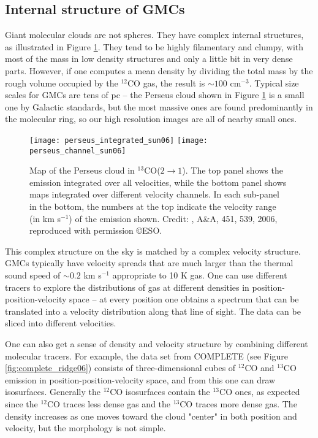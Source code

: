\subsection{Internal structure of GMCs}

Giant molecular clouds are not spheres. They have complex internal structures, as illustrated in Figure \ref{fig:perseus_sun06}. They tend to be highly filamentary and clumpy, with most of the mass in low density structures and only a little bit in very dense parts. However, if one computes a mean density by dividing the total mass by the rough volume occupied by the $^{12}$CO gas, the result is $\sim 100$ cm$^{-3}$. Typical size scales for GMCs are tens of pc -- the Perseus cloud shown in Figure \ref{fig:perseus_sun06} is a small one by Galactic standards, but the most massive ones are found predominantly in the molecular ring, so our high resolution images are all of nearby small ones.

\begin{figure}
\texttt{[image: perseus\_integrated\_sun06]}
\texttt{[image: perseus\_channel\_sun06]}
\caption[$^{13}$CO($2\rightarrow 1$) maps of Perseus]{
\label{fig:perseus_sun06}
Map of the Perseus cloud in $^{13}$CO($2\rightarrow 1$). The top panel shows the emission integrated over all velocities, while the bottom panel shows maps integrated over different velocity channels. In each sub-panel in the bottom, the numbers at the top indicate the velocity range (in km s$^{-1}$) of the emission shown. Credit: \citeauthor{sun06a}, A\&A, 451, 539, 2006, reproduced with
permission \copyright ESO.
}
\end{figure}

This complex structure on the sky is matched by a complex velocity structure. GMCs typically have velocity spreads that are much larger than the thermal sound speed of $\sim 0.2$ km s$^{-1}$ appropriate to 10 K gas. One can use different tracers to explore the distributions of gas at different densities in position-position-velocity space -- at every position one obtains a spectrum that can be translated into a velocity distribution along that line of sight. The data can be sliced into different velocities.

One can also get a sense of density and velocity structure by combining different molecular tracers. For example, the data set from COMPLETE (see Figure \ref{fig:complete_ridge06}) consists of three-dimensional cubes of $^{12}$CO and $^{13}$CO emission in position-position-velocity space, and from this one can draw isosurfaces. Generally the $^{12}$CO isosurfaces contain the $^{13}$CO ones, as expected since the $^{12}$CO traces less dense gas and the $^{13}$CO traces more dense gas. The density increases as one moves toward the cloud "center" in both position and velocity, but the morphology is not simple.   

